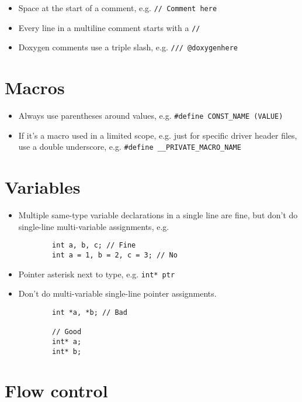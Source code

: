 \documentclass{article}
\begin{document}
\begin{itemize}
	\item Space at the start of a comment, e.g. \lstinline{// Comment here}
	\item Every line in a multiline comment starts with a \lstinline{//}
	\item Doxygen comments use a triple slash, e.g. \lstinline{/// @doxygenhere}
\end{itemize}

\section{Macros}

\begin{itemize}
	\item Always use parentheses around values, e.g. \lstinline{#define CONST_NAME (VALUE)}
	\item If it's a macro used in a limited scope, e.g. just for specific driver header files, use a double underscore, e.g. \lstinline{#define __PRIVATE_MACRO_NAME} 
\end{itemize}

\section{Variables}

\begin{itemize}
	\item Multiple same-type variable declarations in a single line are fine, but don't do single-line multi-variable assignments, e.g.
	\begin{lstlisting}
		int a, b, c; // Fine
		int a = 1, b = 2, c = 3; // No
	\end{lstlisting}

	\item Pointer asterisk next to type, e.g. \lstinline{int* ptr}
	\item Don't do multi-variable single-line pointer assignments.
	\begin{lstlisting}
		int *a, *b; // Bad

		// Good
		int* a;
		int* b;
	\end{lstlisting}
\end{itemize}

\section{Flow control}
\end{document}
